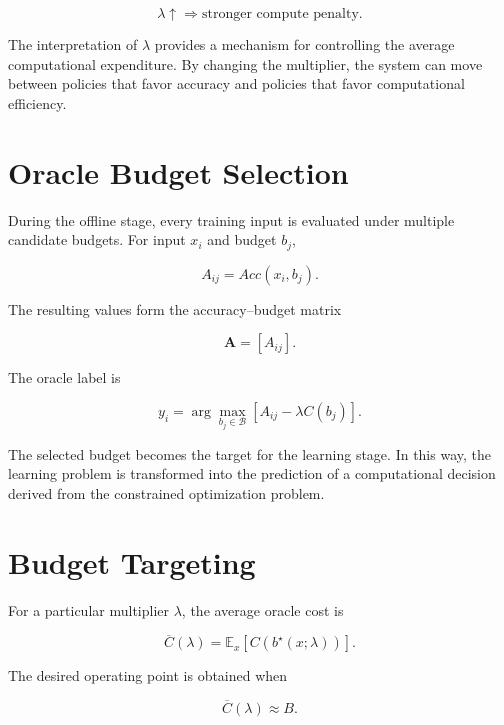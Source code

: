 \documentclass[12pt,a4paper,titlepage]{report}
\begin{document}
\begin{equation}
\lambda\uparrow
\Rightarrow
\text{stronger compute penalty}.
\end{equation}

The interpretation of $\lambda$ provides a mechanism for controlling the average computational expenditure. By changing the multiplier, the system can move between policies that favor accuracy and policies that favor computational efficiency.

\section{Oracle Budget Selection}

During the offline stage, every training input is evaluated under multiple candidate budgets. For input $x_i$ and budget $b_j$,

\begin{equation}
A_{ij}=Acc(x_i,b_j).
\end{equation}

The resulting values form the accuracy--budget matrix

\begin{equation}
\mathbf{A}=[A_{ij}].
\end{equation}

The oracle label is

\begin{equation}
y_i
=
\arg\max_{b_j\in\mathcal{B}}
[
A_{ij}-\lambda C(b_j)
].
\end{equation}

The selected budget becomes the target for the learning stage. In this way, the learning problem is transformed into the prediction of a computational decision derived from the constrained optimization problem.

\section{Budget Targeting}

For a particular multiplier $\lambda$, the average oracle cost is

\begin{equation}
\overline{C}(\lambda)
=
\mathbb{E}_x
[
C(b^\star(x;\lambda))
].
\end{equation}

The desired operating point is obtained when

\begin{equation}
\overline{C}(\lambda)\approx B.
\end{equation}
\end{document}
